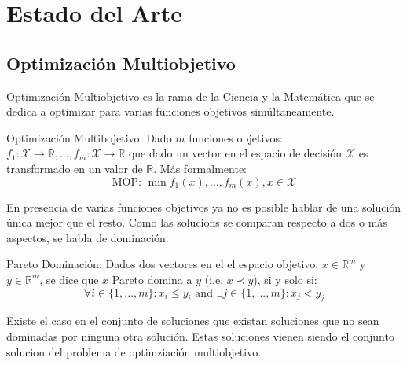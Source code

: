 
\chapter{Estado del Arte}\label{chapter:state-of-the-art}

\section{Optimizaci\'on Multiobjetivo}

Optimizaci\'on Multiobjetivo es la rama de la Ciencia y la Matem\'atica que se dedica a optimizar para varias funciones objetivos sim\'ultaneamente.

\begin{definition}{Optimizaci\'on Multibojetivo:}
     Dado $m$ funciones objetivos: $f_1: \mathcal{X} \rightarrow \mathbb{R}, ..., f_m: \mathcal{X} \rightarrow \mathbb{R}$ que dado un vector en el espacio de decisi\'on $\mathcal{X}$ es transformado en un valor de $\mathbb{R}$. M\'as formalmente:
    \begin{equation*}
        \text{MOP: }\min f_1(x), ..., f_m(x), x \in \mathcal{X}
    \end{equation*}
\end{definition}

En presencia de varias funciones objetivos ya no es posible hablar de una soluci\'on \'unica mejor que el resto.  
Como las solucions se comparan respecto a dos o m\'as aspectos, se habla de dominaci\'on.

\begin{definition}{Pareto Dominaci\'on:}
    Dados dos vectores en el el espacio objetivo, $x \in \mathbb{R}^m$ y $y \in \mathbb{R}^m$, se dice que $x$ Pareto domina a $y$ (i.e. $x \prec y$), si y solo si:
    \begin{equation*}
        \forall i \in \{1, ..., m\}: x_i \leq y_i \text{ and } \exists j \in \{1, ..., m\}: x_j < y_j 
    \end{equation*}
\end{definition}

Existe el caso en el conjunto de soluciones que existan soluciones que no sean dominadas por ninguna otra soluci\'on. Estas soluciones vienen siendo el conjunto solucion del problema de optimziaci\'on multiobjetivo.


